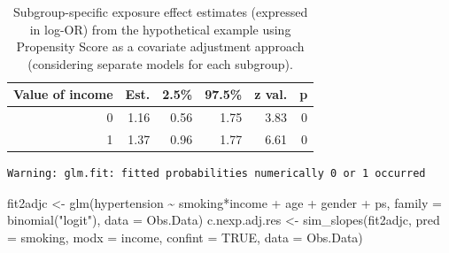 \documentclass[
  letterpaper,
  DIV=11,
  numbers=noendperiod]{scrreprt}
\newenvironment{Shaded}{\begin{snugshade}}{\end{snugshade}}
\newcommand{\AttributeTok}[1]{\textcolor[rgb]{0.40,0.45,0.13}{#1}}
\newcommand{\CommentTok}[1]{\textcolor[rgb]{0.37,0.37,0.37}{#1}}
\newcommand{\ConstantTok}[1]{\textcolor[rgb]{0.56,0.35,0.01}{#1}}
\newcommand{\FunctionTok}[1]{\textcolor[rgb]{0.28,0.35,0.67}{#1}}
\newcommand{\NormalTok}[1]{\textcolor[rgb]{0.00,0.23,0.31}{#1}}
\newcommand{\OtherTok}[1]{\textcolor[rgb]{0.00,0.23,0.31}{#1}}
\newcommand{\SpecialCharTok}[1]{\textcolor[rgb]{0.37,0.37,0.37}{#1}}
\newcommand{\StringTok}[1]{\textcolor[rgb]{0.13,0.47,0.30}{#1}}
\begin{document}
\hypertarget{tbl-cont-var}{}
\begin{table}[!h]
\caption{\label{tbl-cont-var}Subgroup-specific exposure effect estimates (expressed in log-OR) from
the hypothetical example using Propensity Score as a covariate
adjustment approach (considering separate models for each subgroup). }\tabularnewline

\centering
\begin{tabular}{rrrrrr}
\toprule
Value of income & Est. & 2.5\% & 97.5\% & z val. & p\\
\midrule
0 & 1.16 & 0.56 & 1.75 & 3.83 & 0\\
1 & 1.37 & 0.96 & 1.77 & 6.61 & 0\\
\bottomrule
\end{tabular}
\end{table}

\begin{Shaded}
\end{Shaded}

\begin{verbatim}
Warning: glm.fit: fitted probabilities numerically 0 or 1 occurred
\end{verbatim}

\begin{Shaded}
\begin{Highlighting}[]
\NormalTok{fit2adjc }\OtherTok{\textless{}{-}} \FunctionTok{glm}\NormalTok{(hypertension }\SpecialCharTok{\textasciitilde{}}\NormalTok{ smoking}\SpecialCharTok{*}\NormalTok{income }\SpecialCharTok{+}\NormalTok{ age }\SpecialCharTok{+}\NormalTok{ gender }\SpecialCharTok{+}\NormalTok{ ps, }
                \AttributeTok{family =} \FunctionTok{binomial}\NormalTok{(}\StringTok{"logit"}\NormalTok{), }
                \AttributeTok{data =}\NormalTok{ Obs.Data)}
\NormalTok{c.nexp.adj.res }\OtherTok{\textless{}{-}} \FunctionTok{sim\_slopes}\NormalTok{(fit2adjc,}
                             \AttributeTok{pred =}\NormalTok{ smoking, }\AttributeTok{modx =}\NormalTok{ income,}
                             \AttributeTok{confint =} \ConstantTok{TRUE}\NormalTok{,}
                             \AttributeTok{data =}\NormalTok{ Obs.Data)}
\end{Highlighting}
\end{Shaded}
\end{document}
